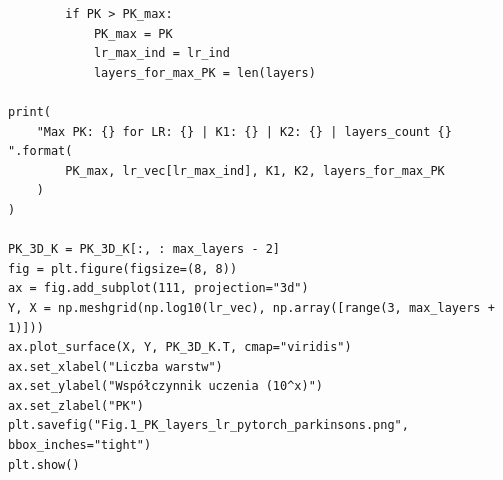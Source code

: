 \documentclass[a4paper]{article}
\begin{document}
\begin{verbatim}
        if PK > PK_max:
            PK_max = PK
            lr_max_ind = lr_ind
            layers_for_max_PK = len(layers)

print(
    "Max PK: {} for LR: {} | K1: {} | K2: {} | layers_count {} ".format(
        PK_max, lr_vec[lr_max_ind], K1, K2, layers_for_max_PK
    )
)

PK_3D_K = PK_3D_K[:, : max_layers - 2]
fig = plt.figure(figsize=(8, 8))
ax = fig.add_subplot(111, projection="3d")
Y, X = np.meshgrid(np.log10(lr_vec), np.array([range(3, max_layers + 1)]))
ax.plot_surface(X, Y, PK_3D_K.T, cmap="viridis")
ax.set_xlabel("Liczba warstw")
ax.set_ylabel("Współczynnik uczenia (10^x)")
ax.set_zlabel("PK")
plt.savefig("Fig.1_PK_layers_lr_pytorch_parkinsons.png", bbox_inches="tight")
plt.show()

\end{verbatim}
\newpage
\end{document}

